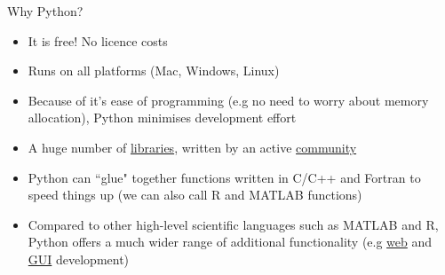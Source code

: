 \documentclass[xcolor=table]{beamer}
\begin{document}
\begin{frame}{Why Python?}

\begin{itemize}\addtolength{\itemsep}{0.5\baselineskip}
	\item<1-> It is free! No licence costs
	\item<2-> Runs on all platforms (Mac, Windows, Linux)
	\item<3-> Because of it's ease of programming (e.g no need to worry about memory allocation), Python minimises development effort
	\item<4-> A huge number of \href{https://pypi.python.org/pypi}{libraries}, written by an active \href{https://www.python.org/community/}{community}  
	\item<5-> Python can ``glue" together functions written in C/C++ and Fortran to speed things up (we can also call R and MATLAB functions)
	\item<6-> Compared to other high-level scientific languages such as MATLAB and R, Python offers a much wider range of additional functionality (e.g \href{https://www.djangoproject.com/}{web} and \href{https://wiki.python.org/moin/TkInter}{GUI} development) %
\end{itemize}

\end{frame}
\end{document}
